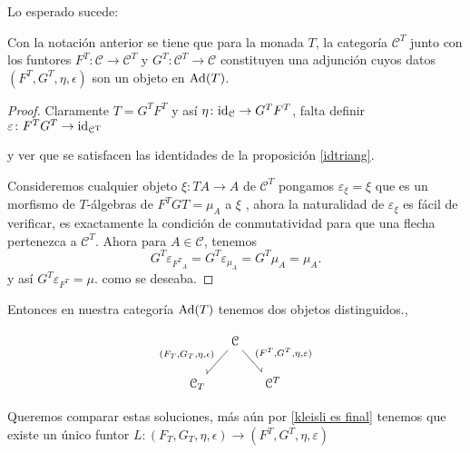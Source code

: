 \documentclass{comunicaciones}
\begin{document}
Lo esperado sucede:


\begin{prop}\label{AdEilenbergMoore}
Con la notación anterior se tiene que para la monada $T$, la categoría $\mathcal{C}^{T}$ junto con los funtores $F^{T}\colon\mathcal{C}\rightarrow\mathcal{C}^{T}$ y $G^{T}\colon\mathcal{C}^{T}\rightarrow\mathcal{C}$
constituyen una adjunción cuyos datos $(F^{T},G^{T},\eta,\epsilon)$ son un objeto en ${\rm Ad}(T)$.
\end{prop}


\begin{proof}

Claramente $T=G^{T}F^{T}$ y así $\eta\colon {\rm id_{\mathcal{C}}}\rightarrow G^{T}F^{T}$, falta definir $\varepsilon\colon F^{T}G^{T}\rightarrow {\rm id_{\mathcal{C}^{T}}}$

y ver que se satisfacen las identidades de la proposición \ref{idtriang}.


Consideremos cualquier objeto $\xi\colon TA\rightarrow A$ de $\mathcal{C}^{T}$ pongamos $\varepsilon_{\xi}=\xi$ que es un morfismo de $T$-álgebras de $F^{T}G{T}=\mu_{A}$ a $\xi$
, ahora la naturalidad de $\varepsilon_{\xi}$ es fácil de verificar, es exactamente la condición de conmutatividad para que una flecha pertenezca a $\mathcal{C}^{T}$.
Ahora para $A\in\mathcal{C}$, tenemos \[G^{T}\varepsilon_{{F^{T}}_{A}}=G^{T}\varepsilon_{\mu_{A}}=G^{T}\mu_{A}=\mu_{A}.\]
y así $G^{T}\varepsilon_{{F^{T}}}=\mu.$ como se deseaba.
\end{proof}
    
Entonces en nuestra categoría ${\rm Ad}(T)$ tenemos dos objetos distinguidos., 




\[\begin{tikzcd}[column sep=small]
	 & \mathcal{C}\ar[dl, rightharpoondown, "{(F_{T},G_{T},\eta,\epsilon)}"']\ar[dr, rightharpoonup, "{(F^{T},G^{T},\eta,\varepsilon)}"] & \\  \mathcal{C}_{T}  & & \mathcal{C}^{T} 
\end{tikzcd}\]


Queremos comparar estas soluciones, más aún por \ref{kleisli es final} tenemos que existe un único funtor $L\colon (F_{T},G_{T},\eta,\epsilon)\rightarrow (F^{T},G^{T},\eta,\varepsilon)$
\end{document}
